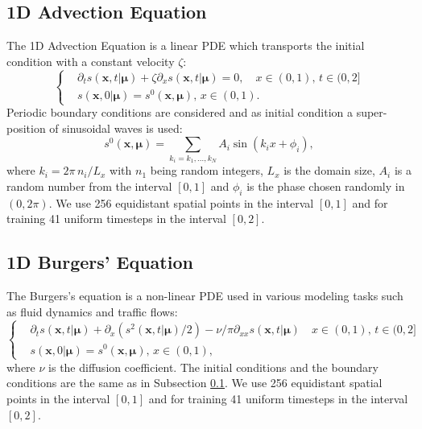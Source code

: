 \subsection{1D Advection Equation}
\label{subsubsec:advection_dataset}
The 1D Advection Equation is a linear PDE which transports the initial condition with a constant velocity $\zeta$:
\begin{equation}
\label{eq:advection}
    \left\{
    \begin{aligned}
    &\partial_t s(\mathbf{x},t|\pmb{\mu})+\zeta \partial_x s(\mathbf{x},t|\pmb{\mu})= 0,\quad x\in(0,1),\, t\in(0,2]\\
    &  s(\mathbf{x},0|\pmb{\mu}) = s^0(\mathbf{x},\pmb{\mu}),\, x\in(0,1).
    \end{aligned}
    \right.
\end{equation}
Periodic boundary conditions are considered and as initial condition a super-position of sinusoidal waves is used:
\begin{equation}
    s^0(\mathbf{x},\pmb{\mu}) = \sum_{k_i=k_1,...,k_N}A_i \sin(k_i x+\phi_i),
\end{equation}
where $k_i = 2\pi\,{n_i}/L_x$ with ${n_1}$ being random integers, $L_x$ is the domain size, $A_i$ is a random number from the interval $[0,1]$ and $\phi_i$ is the phase chosen randomly in $(0,2\pi)$. We use 256 equidistant spatial points in the interval $[0,1]$ and for training 41 uniform timesteps in the interval $[0,2]$.
\subsection{1D Burgers' Equation}
The Burgers's equation is a non-linear PDE used in various modeling tasks such as fluid dynamics and traffic flows:
\begin{equation}
\label{eq:burger}
    \left\{
    \begin{aligned}
    &\partial_t s(\mathbf{x},t|\pmb{\mu})+\partial_x(s^2(\mathbf{x},t|\pmb{\mu})/2)-\nu/\pi\partial_{xx}s(\mathbf{x},t|\pmb{\mu})\quad x\in(0,1),\, t\in(0,2]\\
    &  s(\mathbf{x},0|\pmb{\mu}) = s^0(\mathbf{x},\pmb{\mu}),\, x\in(0,1),
    \end{aligned}
    \right.
\end{equation}
where $\nu$ is the diffusion coefficient. The initial conditions and the boundary conditions are the same as in Subsection \ref{subsubsec:advection_dataset}. We use 256 equidistant spatial points in the interval $[0,1]$ and for training 41 uniform timesteps in the interval $[0,2]$.
